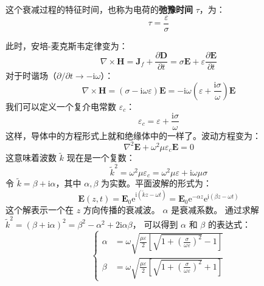 \documentclass[fontset=none]{ctexart}
\begin{document}
这个衰减过程的特征时间，也称为电荷的\textbf{弛豫时间} $\tau$，为：
\begin{equation}
    \tau = \frac{\varepsilon}{\sigma}
\end{equation}

此时，安培-麦克斯韦定律变为：
\begin{equation}
\nabla \times \bm{H} = \bm{J}_f + \frac{\partial \bm{D}}{\partial t} 
= \sigma \bm{E} + \varepsilon \frac{\partial \bm{E}}{\partial t}
\end{equation}
对于时谐场（$\partial/\partial t \to -\mathrm{i}\omega$）：
\begin{equation}
\nabla \times \bm{H} = (\sigma - \mathrm{i}\omega\varepsilon)\bm{E} 
= -\mathrm{i}\omega\left(\varepsilon + \frac{\mathrm{i}\sigma}{\omega}\right)\bm{E}
\end{equation}
我们可以定义一个复介电常数 $\varepsilon_c$：
\begin{equation}
\varepsilon_c = \varepsilon + \frac{\mathrm{i}\sigma}{\omega}
\end{equation}
这样，导体中的方程形式上就和绝缘体中的一样了。波动方程变为：
\begin{equation}
\nabla^2 \bm{E} + \omega^2\mu\varepsilon_c \bm{E} = 0
\end{equation}
这意味着波数 $\tilde{k}$ 现在是一个复数：
\begin{equation}
\tilde{k}^2 = \omega^2\mu\varepsilon_c = \omega^2\mu\varepsilon + \mathrm{i}\omega\mu\sigma
\end{equation}
令 $\tilde{k} = \beta + \mathrm{i}\alpha$，其中 $\alpha, \beta$ 为实数。平面波解的形式为：
\begin{equation}
\bm{E}(z,t) = \bm{E}_0 \mathrm{e}^{\mathrm{i}(\tilde{k}z - \omega t)} 
= \bm{E}_0 \mathrm{e}^{-\alpha z} \mathrm{e}^{\mathrm{i}(\beta z - \omega t)}
\end{equation}
这个解表示一个在 $z$ 方向传播的衰减波。 $\alpha$ 是衰减系数。
通过求解 $\tilde{k}^2 = (\beta+\mathrm{i}\alpha)^2 = \beta^2-\alpha^2+2\mathrm{i}\alpha\beta$，
可以得到 $\alpha$ 和 $\beta$ 的表达式：
\begin{equation}
\label{eq:alpha_beta}
\left\{
\begin{aligned}
\alpha &= \omega \sqrt{\frac{\mu\varepsilon}{2}\left[\sqrt{1+\left(\frac{\sigma}{\omega\varepsilon}\right)^2} - 1\right]} \\
\beta &= \omega \sqrt{\frac{\mu\varepsilon}{2}\left[\sqrt{1+\left(\frac{\sigma}{\omega\varepsilon}\right)^2} + 1\right]}
\end{aligned}
\right.
\end{equation}
\end{document}
